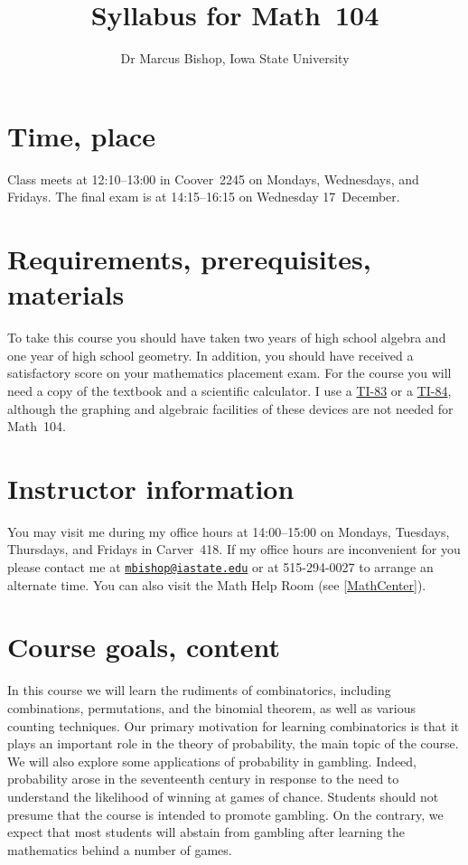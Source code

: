 \documentclass[11pt]{article}
\title{Syllabus for Math~104}
\author{Dr Marcus Bishop, Iowa State University}
\begin{document}
\maketitle

\section{Time, place}\label{Time} Class meets at 12:10--13:00
in Coover~2245 on Mondays, Wednesdays, and Fridays.
The final exam is at 14:15--16:15 on Wednesday 17~December.

\section{Requirements, prerequisites, materials}
To take this course you should have taken two
years of high school algebra and one year of high school geometry.
In addition, you should
have received a satisfactory score on your mathematics placement exam.
For the course you will need a copy of the textbook
and a scientific calculator.
I use a \href{http://en.wikipedia.org/wiki/TI-83}{TI-83} or a
\href{http://en.wikipedia.org/wiki/TI-84}{TI-84}, although
the graphing and algebraic facilities of these devices are
not needed for Math~104.

\section{Instructor information} You may visit me during my office 
hours at 14:00--15:00 on Mondays, Tuesdays, Thursdays, and Fridays
in Carver~418. If my office hours are inconvenient for you
please contact me at 
\href{mailto:mbishop@iastate.edu}{\tt mbishop@iastate.edu} or at 
515-294-0027 to arrange an alternate time.
You can also visit the Math Help Room (see \autoref{MathCenter}).

\section{Course goals, content}
In this course we will learn the rudiments of combinatorics,
including combinations, permutations, and the binomial theorem,
as well as various counting techniques.
Our primary motivation for learning combinatorics is that it
plays an important role in the theory of probability, the main
topic of the course. We will also explore some
applications of probability in gambling. Indeed, probability
arose in the seventeenth century in response to the need
to understand the likelihood of winning at games of chance.
Students should not presume that the course is intended to
promote gambling. On the contrary, we expect that most
students will abstain from gambling after learning the mathematics
behind a number of games.
\end{document}
